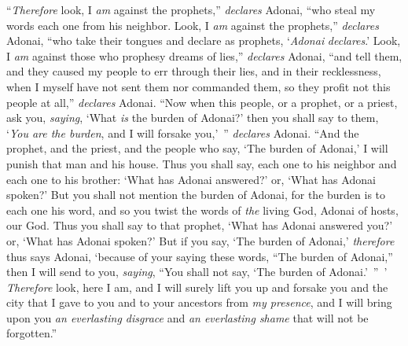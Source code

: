\begin{biblechapter}
\verse “\textit{Therefore} look, I \textit{am} against the prophets,” \textit{declares} Adonai, “who steal my words each one from his neighbor.
\verse Look, I \textit{am} against the prophets,” \textit{declares} Adonai, “who take their tongues and declare as prophets, ‘\textit{Adonai} \textit{declares}.’
\verse Look, I \textit{am} against those who prophesy dreams of lies,” \textit{declares} Adonai, “and tell them, and they caused my people to err through their lies, and in their recklessness, when I myself have not sent them nor commanded them, so they profit not this people at all,” \textit{declares} Adonai.
\verse “Now when this people, or a prophet, or a priest, ask you, \textit{saying}, ‘What \textit{is} the burden of Adonai?’ then you shall say to them, ‘\textit{You are the burden}, and I will forsake you,’ ” \textit{declares} Adonai.
\verse “And the prophet, and the priest, and the people who say, ‘The burden of Adonai,’ I will punish that man and his house.
\verse Thus you shall say, each one to his neighbor and each one to his brother: ‘What has Adonai answered?’ or, ‘What has Adonai spoken?’
\verse But you shall not mention the burden of Adonai, for the burden is to each one his word, and so you twist the words of \textit{the} living God, Adonai of hosts, our God.
\verse Thus you shall say to that prophet, ‘What has Adonai answered you?’ or, ‘What has Adonai spoken?’
\verse But if you say, ‘The burden of Adonai,’ \textit{therefore} thus says Adonai, ‘because of your saying these words, “The burden of Adonai,” then I will send to you, \textit{saying}, “You shall not say, ‘The burden of Adonai.’ ” ’
\verse \textit{Therefore} look, here I am, and I will surely lift you up and forsake you and the city that I gave to you and to your ancestors from \textit{my presence},
\verse and I will bring upon you \textit{an everlasting disgrace} and \textit{an everlasting shame} that will not be forgotten.”
\end{biblechapter}

